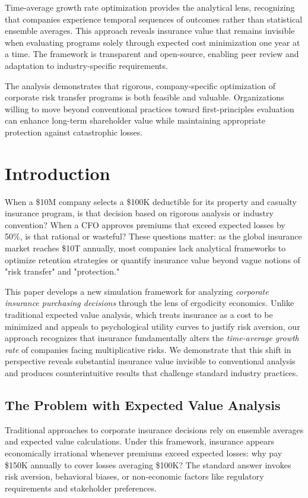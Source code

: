 \documentclass[11pt,letterpaper]{article}
\begin{document}
Time-average growth rate optimization provides the analytical lens, recognizing that companies experience temporal sequences of outcomes rather than statistical ensemble averages. This approach reveals insurance value that remains invisible when evaluating programs solely through expected cost minimization one year at a time. The framework is transparent and open-source, enabling peer review and adaptation to industry-specific requirements.

The analysis demonstrates that rigorous, company-specific optimization of corporate risk transfer programs is both feasible and valuable. Organizations willing to move beyond conventional practices toward first-principles evaluation can enhance long-term shareholder value while maintaining appropriate protection against catastrophic losses.

\section{Introduction}

When a \$10M company selects a \$100K deductible for its property and casualty insurance program, is that decision based on rigorous analysis or industry convention? When a CFO approves premiums that exceed expected losses by 50\%, is that rational or wasteful? These questions matter: as the global insurance market reaches \$10T annually, most companies lack analytical frameworks to optimize retention strategies or quantify insurance value beyond vague notions of "risk transfer" and "protection."

This paper develops a new simulation framework for analyzing \emph{corporate insurance purchasing decisions} through the lens of ergodicity economics. Unlike traditional expected value analysis, which treats insurance as a cost to be minimized and appeals to psychological utility curves to justify risk aversion, our approach recognizes that insurance fundamentally alters the \emph{time-average growth rate} of companies facing multiplicative risks. We demonstrate that this shift in perspective reveals substantial insurance value invisible to conventional analysis and produces counterintuitive results that challenge standard industry practices.

\subsection{The Problem with Expected Value Analysis}

Traditional approaches to corporate insurance decisions rely on ensemble averages and expected value calculations. Under this framework, insurance appears economically irrational whenever premiums exceed expected losses: why pay \$150K annually to cover losses averaging \$100K? The standard answer invokes risk aversion, behavioral biases, or non-economic factors like regulatory requirements and stakeholder preferences.
\end{document}
